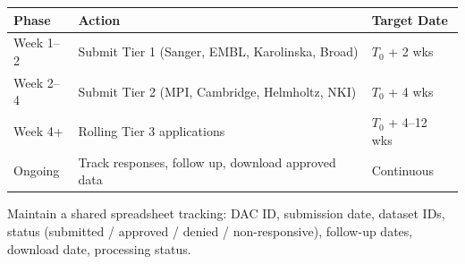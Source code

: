 \documentclass[11pt,letterpaper]{article}
\begin{document}
\begin{tabular}{@{} l l l @{}}
\toprule
\textbf{Phase} & \textbf{Action} & \textbf{Target Date} \\
\midrule
Week 1--2 & Submit Tier 1 (Sanger, EMBL, Karolinska, Broad) & $T_0$ + 2 wks \\
Week 2--4 & Submit Tier 2 (MPI, Cambridge, Helmholtz, NKI) & $T_0$ + 4 wks \\
Week 4+ & Rolling Tier 3 applications & $T_0$ + 4--12 wks \\
Ongoing & Track responses, follow up, download approved data & Continuous \\
\bottomrule
\end{tabular}

\bigskip
\noindent Maintain a shared spreadsheet tracking: DAC ID, submission date,
dataset IDs, status (submitted / approved / denied / non-responsive),
follow-up dates, download date, processing status.
\end{document}
